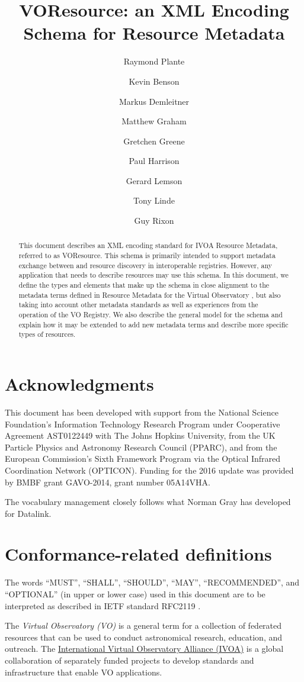 \documentclass[11pt,a4paper]{ivoa}
\title{VOResource: an XML Encoding Schema for Resource Metadata}
\author[http://www.ivoa.net/twiki/bin/view/IVOA/RayPlante]{Raymond Plante}
\author[http://www.ivoa.net/twiki/bin/view/IVOA/KevinBenson]{Kevin Benson}
\author[http://www.ivoa.net/twiki/bin/view/IVOA/MarkusDemleitner]{Markus Demleitner}
\author[http://www.ivoa.net/twiki/bin/view/IVOA/MatthewGraham]{Matthew Graham}
\author[http://www.ivoa.net/twiki/bin/view/IVOA/GretchenGreene]{Gretchen Greene}
\author[http://www.ivoa.net/twiki/bin/view/IVOA/PaulHarrison]{Paul Harrison}
\author[http://www.ivoa.net/twiki/bin/view/IVOA/GerardLemson]{Gerard Lemson}
\author[http://www.ivoa.net/twiki/bin/view/IVOA/TonyLinde]{Tony Linde}
\author[http://www.ivoa.net/twiki/bin/view/IVOA/GuyRixon]{Guy Rixon}
\begin{document}
\begin{abstract}
This document describes an XML encoding standard for IVOA Resource
Metadata, referred to as VOResource.  This schema is primarily
intended to support metadata exchange between and resource discovery
in interoperable registries.
However, any application that needs to describe resources
may use this schema.  In this document, we define the types and
elements that make up the schema in close alignment to the metadata terms
defined in Resource Metadata for the Virtual Observatory
\citep{2007ivoa.spec.0302H}, but also taking into account other metadata
standards as well as experiences from the operation of the VO Registry.
We also describe the general model for the
schema and explain how it may be extended to add new metadata terms and
describe more specific types of resources.  
\end{abstract}


\section*{Acknowledgments}

This document has been developed with support from the
National Science Foundation's
Information Technology Research Program under Cooperative Agreement
AST0122449 with The Johns Hopkins University, from the
UK Particle Physics and Astronomy
Research Council (PPARC), and from the
European Commission's Sixth
Framework Program via the 
Optical Infrared Coordination Network (OPTICON).  Funding for the 2016
update was provided by BMBF grant GAVO-2014, grant number 05A14VHA.

The vocabulary management closely follows what Norman Gray  has
developed for Datalink.

\section*{Conformance-related definitions}

The words ``MUST'', ``SHALL'', ``SHOULD'', ``MAY'', ``RECOMMENDED'', and
``OPTIONAL'' (in upper or lower case) used in this document are to be
interpreted as described in IETF standard RFC2119 \citep{std:RFC2119}.

The \emph{Virtual Observatory (VO)} is a
general term for a collection of federated resources that can be used
to conduct astronomical research, education, and outreach.
The \href{http://www.ivoa.net}{International
Virtual Observatory Alliance (IVOA)} is a global
collaboration of separately funded projects to develop standards and
infrastructure that enable VO applications.
\end{document}

